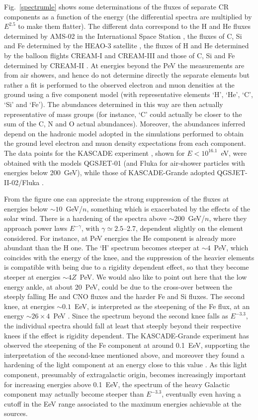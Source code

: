 \documentclass[twoside,12pt]{article}
\begin{document}
Fig.~\ref{spectrumle} shows some determinations of the fluxes of separate CR components as a function of the energy (the differential spectra are multiplied by $E^{2.5}$ to make them flatter). The different data correspond to the H and He fluxes determined by AMS-02 in the International Space Station \cite{amsh,amshe}, the fluxes of C, Si and Fe determined by the HEAO-3 satellite \cite{heao}, the fluxes of H and He determined by the balloon flights CREAM-I and CREAM-III \cite{cream3} and those of C, Si and Fe determined by CREAM-II \cite{cream2}. At energies beyond the PeV the measurements are from air showers, and hence do not determine directly the separate elements but rather a fit is performed to the observed electron and muon densities at the ground using a five component model (with representative elements `H', `He', `C', `Si' and `Fe'). The abundances determined in this way are then actually representative of mass groups (for instance, `C' could actually be closer to the sum of the C, N and O actual abundances). Moreover, the abundances inferred depend on the hadronic model adopted in the simulations performed to obtain the ground level electron and muon density expectations from each component. The data points for the KASCADE experiment \cite{ka08},  shown for $E<10^{16.1}$~eV,  were obtained with the models QGSJET-01 (and Fluka for air-shower particles with energies below 200~GeV), while those of KASCADE-Grande adopted QGSJET-II-02/Fluka \cite{ap13}.

From the figure one can appreciate the strong suppression of the fluxes at energies below $\sim 10$~GeV/$n$, something which is exacerbated by the effects of the solar wind. There is a hardening of the spectra above $\sim 200$~GeV/$n$, where they approach power laws $E^{-\gamma}$, with $\gamma\simeq 2.5$--2.7, dependent slightly on the element considered. For instance, at PeV energies the He component is already more abundant than the H one. The `H' spectrum becomes steeper at $\sim 4$~PeV, which coincides with the energy of the knee, and the suppression of the heavier elements is compatible with being due to a rigidity dependent effect, so that they become steeper at energies $\sim 4Z$~PeV. We would also like to point out here that the low energy ankle, at about 20~PeV, could be due to the cross-over between the steeply falling He and CNO fluxes and the harder Fe and Si fluxes. The second knee, at energies $\sim 0.1$~EeV, is interpreted as the steepening of the Fe flux,  at an energy $\sim 26\times 4$~PeV \cite{caanti}. Since the spectrum beyond the second knee falls as $E^{-3.3}$, the individual spectra should fall at least that steeply beyond their respective knees if the effect is rigidity dependent. The KASCADE-Grande experiment has observed the steepening of the Fe component at around 0.1~EeV, supporting the interpretation of the second-knee mentioned  above, and moreover they found a hardening of the light component at an energy close to this value  \cite{ap13}. As this light component, presumably of extragalactic origin, becomes increasingly important for increasing energies above 0.1~EeV, the spectrum of the heavy Galactic component may actually become steeper than  $E^{-3.3}$, eventually even having a cutoff in the EeV range associated to the maximum energies achievable at the sources. 
\end{document}
